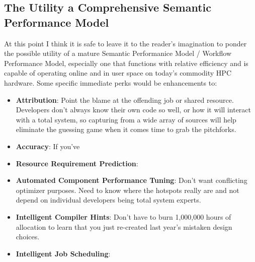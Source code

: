 
\subsection{The Utility a Comprehensive Semantic Performance Model}

At this point I think it is safe to leave it to the reader's
imagination to ponder the possible utility of a mature Semantic
Performanice Model / Workflow Performance Model, especially one
that functions with relative efficiency and is capable of operating
online and in user space on today's commodity HPC hardware.
Some specific immediate perks would be enhancements to:
\begin{itemize}
\item \textbf{Attribution}: Point the blame at the offending job or shared
  resource. Developers don't always know their own code so well,
  or how it will interact with a total system, so capturing from a
  wide array of sources will help eliminate the guessing game when it
  comes time to grab the pitchforks.
\item \textbf{Accuracy}: If you've 
\item \textbf{Resource Requirement Prediction}:
\item \textbf{Automated Component Performance Tuning}: Don't want conflicting
  optimizer purposes. Need to know where the hotspots really are and
  not depend on individual developers being total system experts.
\item \textbf{Intelligent Compiler Hints}: Don't have to burn 1,000,000 hours
  of allocation to learn that you just re-created last year's mistaken
design choices.
\item \textbf{Intelligent Job Scheduling}:
\end{itemize}

